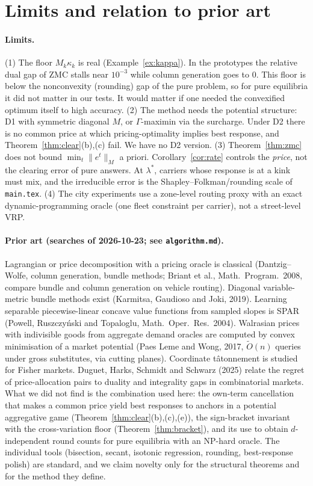 \documentclass[11pt]{article}
\theoremstyle{definition}
\theoremstyle{remark}
\begin{document}
\section{Limits and relation to prior art}\label{sec:limits}

\paragraph{Limits.}
(1) The floor $M_k\kappa_k$ is real (Example~\ref{ex:kappa}). In the prototypes the relative dual gap of ZMC stalls near $10^{-3}$ while column generation goes to $0$. This floor is below the nonconvexity (rounding) gap of the pure problem, so for pure equilibria it did not matter in our tests. It would matter if one needed the convexified optimum itself to high accuracy.
(2) The method needs the potential structure: D1 with symmetric diagonal $M$, or $\Gamma$-maximin via the surcharge. Under D2 there is no common price at which pricing-optimality implies best response, and Theorem~\ref{thm:clear}(b),(c) fail. We have no D2 version.
(3) Theorem~\ref{thm:zmc} does not bound $\min_t\|e^t\|_M$ a priori. Corollary~\ref{cor:rate} controls the \emph{price}, not the clearing error of pure answers. At $\lambda^*$, carriers whose response is at a kink must mix, and the irreducible error is the Shapley--Folkman/rounding scale of \texttt{main.tex}.
(4) The city experiments use a zone-level routing proxy with an exact dynamic-programming oracle (one fleet constraint per carrier), not a street-level VRP.

\paragraph{Prior art (searches of 2026-10-23; see \texttt{algorithm.md}).}
Lagrangian or price decomposition with a pricing oracle is classical (Dantzig--Wolfe, column generation, bundle methods; Briant et al., Math.\ Program.\ 2008, compare bundle and column generation on vehicle routing). Diagonal variable-metric bundle methods exist (Karmitsa, Gaudioso and Joki, 2019). Learning separable piecewise-linear concave value functions from sampled slopes is SPAR (Powell, Ruszczy\'nski and Topaloglu, Math.\ Oper.\ Res.\ 2004). Walrasian prices with indivisible goods from aggregate demand oracles are computed by convex minimisation of a market potential (Paes Leme and Wong, 2017, $\tilde O(n)$ queries under gross substitutes, via cutting planes). Coordinate t\^atonnement is studied for Fisher markets. Duguet, Harks, Schmidt and Schwarz (2025) relate the regret of price-allocation pairs to duality and integrality gaps in combinatorial markets. What we did not find is the combination used here: the own-term cancellation that makes a common price yield best responses to anchors in a potential aggregative game (Theorem~\ref{thm:clear}(b),(c),(e)), the sign-bracket invariant with the cross-variation floor (Theorem~\ref{thm:bracket}), and its use to obtain $d$-independent round counts for pure equilibria with an NP-hard oracle. The individual tools (bisection, secant, isotonic regression, rounding, best-response polish) are standard, and we claim novelty only for the structural theorems and for the method they define.
\end{document}
